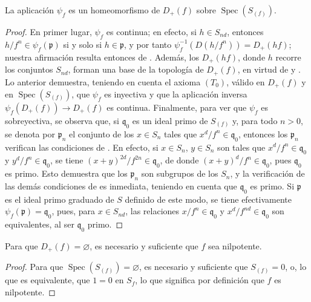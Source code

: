 \documentclass[oneside,10pt]{amsart}
\newcommand{\oldpage}[2][]{\marginnote{\normalfont\footnotesize\textbf{#1}~|~#2}\ignorespaces}
\let\EGAOriginalLabel\label
\renewcommand{\label}[1]{\phantomsection\EGAOriginalLabel{#1}}
\begin{document}
\begin{proposition}[2.3.6]
\label{II.2.3.6-fr}
La aplicación $\psi_f$ es un homeomorfismo de $D_+(f)$ sobre $\operatorname{Spec}(S_{(f)})$.
\end{proposition}

\begin{proof}
En primer lugar, $\psi_f$ es continua; en efecto, si $h\in S_{nd}$, entonces $h/f^n\in\psi_f(\mathfrak{p})$ si y solo si $h\in\mathfrak{p}$, y por tanto $\psi_f^{-1}(D(h/f^n))=D_+(hf)$; nuestra afirmación resulta entonces de .
Además, los $D_+(hf)$, donde $h$ recorre los conjuntos $S_{nd}$, forman una base de la topología de $D_+(f)$, en virtud de  y .
Lo
\oldpage[II]{27}
anterior demuestra, teniendo en cuenta el axioma $(T_0)$, válido en $D_+(f)$ y en $\operatorname{Spec}(S_{(f)})$, que $\psi_f$ es inyectiva y que la aplicación inversa $\psi_f(D_+(f))\longrightarrow D_+(f)$ es continua.
Finalmente, para ver que $\psi_f$ es sobreyectiva, se observa que, si $\mathfrak{q}_0$ es un ideal primo de $S_{(f)}$ y, para todo $n>0$, se denota por $\mathfrak{p}_n$ el conjunto de los $x\in S_n$ tales que $x^d/f^n\in\mathfrak{q}_0$, entonces los $\mathfrak{p}_n$ verifican las condiciones de .
En efecto, si $x\in S_n$, $y\in S_n$ son tales que $x^d/f^n\in\mathfrak{q}_0$ y $y^d/f^n\in\mathfrak{q}_0$, se tiene $(x+y)^{2d}/f^{2n}\in\mathfrak{q}_0$, de donde $(x+y)^d/f^n\in\mathfrak{q}_0$, pues $\mathfrak{q}_0$ es primo.
Esto demuestra que los $\mathfrak{p}_n$ son subgrupos de los $S_n$, y la verificación de las demás condiciones de  es inmediata, teniendo en cuenta que $\mathfrak{q}_0$ es primo.
Si $\mathfrak{p}$ es el ideal primo graduado de $S$ definido de este modo, se tiene efectivamente $\psi_f(\mathfrak{p})=\mathfrak{q}_0$, pues, para $x\in S_{nd}$, las relaciones $x/f^n\in\mathfrak{q}_0$ y $x^d/f^{nd}\in\mathfrak{q}_0$ son equivalentes, al ser $\mathfrak{q}_0$ primo.
\end{proof}

\begin{corollary}[2.3.7]
\label{II.2.3.7-fr}
Para que $D_+(f)=\varnothing$, es necesario y suficiente que $f$ sea nilpotente.
\end{corollary}

\begin{proof}
Para que $\operatorname{Spec}(S_{(f)})=\varnothing$, es necesario y suficiente que $S_{(f)}=0$, o, lo que es equivalente, que $1=0$ en $S_f$, lo que significa por definición que $f$ es nilpotente.
\end{proof}
\end{document}
